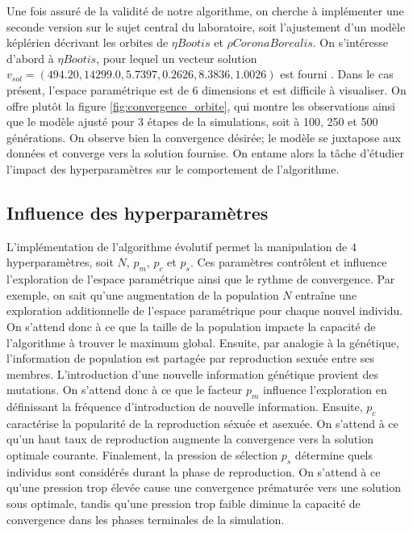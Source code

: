 \documentclass{article}
\begin{document}
Une fois assuré de la validité de notre algorithme, on cherche à implémenter une seconde version sur le sujet central du laboratoire, soit l'ajustement d'un modèle képlérien décrivant les orbites de $\eta Bootis$ et $\rho CoronaBorealis$. On s'intéresse d'abord à $\eta Bootis$, pour lequel un vecteur solution $v_{sol} = (494.20, 14299.0, 5.7397, 0.2626, 8.3836, 1.0026)$ est fourni \cite{notes_cours}. Dans le cas présent, l'espace paramétrique est de 6 dimensions et est difficile à visualiser. On offre plutôt la figure \ref{fig:convergence_orbite}, qui montre les observations ainsi que le modèle ajusté pour 3 étapes de la simulations, soit à 100, 250 et 500 générations. On observe bien la convergence désirée; le modèle se juxtapose aux données et converge vers la solution fournise. On entame alors la tâche d'étudier l'impact des hyperparamètres sur le comportement de l'algorithme.

\subsection{Influence des hyperparamètres}

L'implémentation de l'algorithme évolutif permet la manipulation de $4$ hyperparamètres, soit $N$, $p_m$, $p_c$ et $p_s$. Ces paramètres contrôlent et influence l'exploration de l'espace paramétrique ainsi que le rythme de convergence. Par exemple, on sait qu'une augmentation de la population $N$ entraîne une exploration additionnelle de l'espace paramétrique pour chaque nouvel individu. On s'attend donc à ce que la taille de la population impacte la capacité de l'algorithme à trouver le maximum global. Ensuite, par analogie à la génétique, l'information de population est partagée par reproduction sexuée entre ses membres. L'introduction d'une nouvelle information génétique provient des mutations. On s'attend donc à ce que le facteur $p_m$ influence l'exploration en définissant la fréquence d'introduction de nouvelle information. Ensuite, $p_c$ caractérise la popularité de la reproduction séxuée et asexuée. On s'attend à ce qu'un haut taux de reproduction augmente la convergence vers la solution optimale courante. Finalement, la pression de sélection $p_s$ détermine quels individus sont considérés durant la phase de reproduction. On s'attend à ce qu'une pression trop élevée cause une convergence prématurée vers une solution sous optimale, tandis qu'une pression trop faible diminue la capacité de convergence dans les phases terminales de la simulation.
\end{document}
